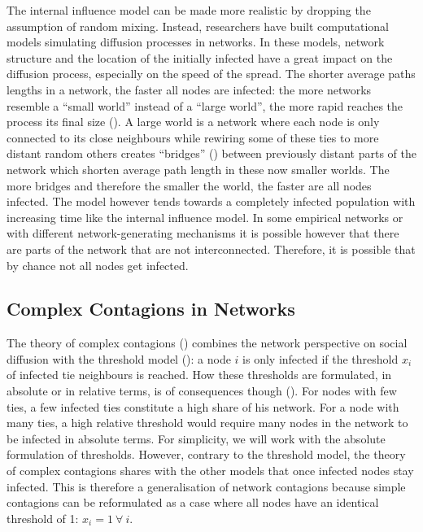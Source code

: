 \documentclass[a4paper,12pt]{article}
\begin{document}
The internal influence model can be made more realistic by dropping the assumption of random mixing. Instead, researchers have built computational models simulating diffusion processes in networks. In these models, network structure and the location of the initially infected have a great impact on the diffusion process, especially on the speed of the spread. The shorter average paths lengths in a network, the faster all nodes are infected: the more networks resemble a ``small world'' instead of a ``large world'', the more rapid reaches the process its final size (\cite{wattsCollectiveDynamicsSmallworld1998}). A large world is a network where each node is only connected to its close neighbours while rewiring some of these ties to more distant random others creates ``bridges'' (\cite{granovetterStrenghtWeakTies1973}) between previously distant parts of the network which shorten average path length in these now smaller worlds. The more bridges and therefore the smaller the world, the faster are all nodes infected. The model however tends towards a completely infected population with increasing time like the internal influence model. In some empirical networks or with different network-generating mechanisms it is possible however that there are parts of the network that are not interconnected. Therefore, it is possible that by chance not all nodes get infected.

\subsection{Complex Contagions in Networks}

The theory of complex contagions (\cite[34ff]{centolaHowBehaviorSpreads2018}) combines the network perspective on social diffusion with the threshold model (\cite{granovetterThresholdModelsCollective1978}): a node $i$ is only infected if the threshold $x_{i}$ of infected tie neighbours is reached. How these thresholds are formulated, in absolute or in relative terms, is of consequences though (\cite[50f]{centolaHowBehaviorSpreads2018}). For nodes with few ties, a few infected ties constitute a high share of his network. For a node with many ties, a high relative threshold would require many nodes in the network to be infected in absolute terms. For simplicity, we will work with the absolute formulation of thresholds. However, contrary to the threshold model, the theory of complex contagions shares with the other models that once infected nodes stay infected. This is therefore a generalisation of network contagions because simple contagions can be reformulated as a case where all nodes have an identical threshold of 1: $x_{i} = 1 \ \forall \ i$.
\end{document}
